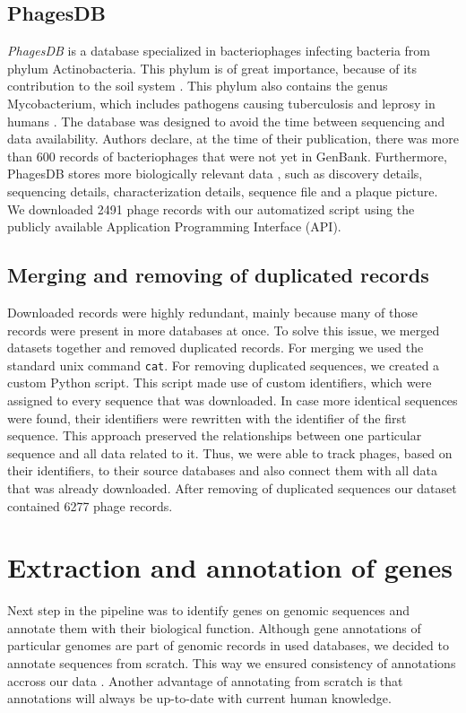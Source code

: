 
\subsection{PhagesDB}
\emph{PhagesDB} is a database specialized in bacteriophages infecting bacteria from phylum Actinobacteria.
This phylum is of great importance, because of its contribution to the soil system \cite{}.
This phylum also contains the genus Mycobacterium, which includes pathogens causing tuberculosis and leprosy in humans \cite{}.
The database was designed to avoid the time between sequencing and data availability.
Authors declare, at the time of their publication, there was more than 600 records of bacteriophages that were not yet in GenBank.
Furthermore, PhagesDB stores more biologically relevant data , such as discovery details, sequencing details, characterization details, sequence file and a plaque picture.
We downloaded 2491 phage records with our automatized script using the publicly available Application Programming Interface (API).

\subsection{Merging and removing of duplicated records}
Downloaded records were  highly redundant, mainly because many of those records were present in  more databases at once.
To solve this issue, we merged datasets together and removed duplicated records.
For merging we used the standard unix command \verb|cat|.
For removing duplicated sequences, we created a custom Python script.
This script made use of custom identifiers, which were assigned to every sequence that was downloaded.
In case more identical sequences were found, their identifiers were rewritten with the identifier of the first sequence.
This approach preserved the relationships between one particular sequence and all data related to it.
Thus, we were able to track phages, based on their identifiers, to their source databases and also connect them with all data that was already downloaded.
After removing of duplicated sequences our dataset contained 6277 phage records.

\section{Extraction and annotation of genes}
Next step in the pipeline was to identify genes on genomic sequences and annotate them with their biological function.
Although gene annotations of particular genomes are part of genomic records in used databases, we decided to annotate sequences from scratch.
This way we ensured consistency of annotations accross our data .
Another advantage of annotating from scratch is that annotations will always be up-to-date with current human knowledge.

